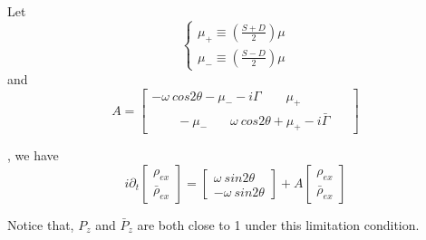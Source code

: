 \documentclass[aps,prd,twocolumn,amsmath,amssymb,groupedaddress]{revtex4-2}
\begin{document}
Let
\begin{equation}
\begin{cases}
	\mu_+ \equiv \left(\frac{S+D}{2}\right) \mu
	\\
	\mu_- \equiv \left(\frac{S-D}{2}\right) \mu
\end{cases}
\end{equation}
and
\begin{equation}
A = \begin{bmatrix}
	-\omega ~cos2\theta-\mu_--i\Gamma ~~~~~~~~~ \mu_+ ~~~~~~~~~~~~~~~~\\ ~~~~~~~~~ -\mu_- ~~~~~~~~ \omega ~cos2\theta+\mu_+-i\bar{\Gamma}
\end{bmatrix}
\end{equation}

, we have
\begin{equation}
	\label{equ:EOM_matrix}
	i \partial_t \begin{bmatrix}
		\rho_{ex} \\ \bar{\rho}_{ex}
	\end{bmatrix} =
	\begin{bmatrix}
		\omega ~sin2\theta \\ - \omega ~sin2\theta
	\end{bmatrix} + A \begin{bmatrix}
		\rho_{ex} \\ \bar{\rho}_{ex}
	\end{bmatrix}
\end{equation}

Notice that, $P_{z}$ and $\bar{P}_{z}$ are both close to 1 under this limitation condition.
\end{document}
